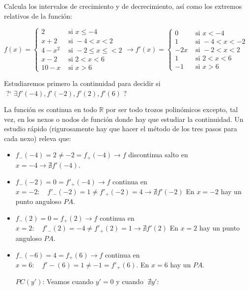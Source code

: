 	\begin{ejem} Calcula los intervalos de crecimiento y de decrecimiento, así como los extremos relativos de la función:
	\label{ejem:extremos-trozos}
	
	$f(x)=\begin{cases}
	  2 & \mbox{ si } x\le -4  \\
	   x + 2& \mbox{ si }  -4<x<2 \\
	 4-x^2 & \mbox{ si } -2 \le x \le <2  \\
	  x-2 & \mbox{ si } 2< x <6  \\
	  10-x& \mbox{ si } x>6   
	\end{cases} \to 
	f'(x)=
	\begin{cases}
	  0 & \mbox{ si } x< -4  \\
	  1 & \mbox{ si }  -4<x < -2 \\
	 -2x & \mbox{ si } -2<x<2  \\
	  1 & \mbox{ si } 2 < x < 6  \\
	  -1 & \mbox{ si } x>6   
	\end{cases}
	$
	
	\noindent Estudiaremos primero la continuidad para decidir si $\mbox{ ?` } \exists f'(-4), f'(-2), f'(2), f'(6) \mbox { ? }$
	
	La función es continua en todo $\mathbb R$ por ser todo trozos polinómicos excepto, tal vez, en los nexos o nodos de función donde hay que estudiar  la continuidad. Un estudio rápido (rigurosamente hay que hacer el método de los tres pasos para cada nexo) releva que:
	
		
	\begin{itemize}

	\item $f_-(-4)=2 \neq -2 =f_+(-4) \to f $ discontinua salto en $x=-4 \to \nexists  f'(-4)$. 
	
	\item $f_-(-2)=0=f'_+(-4) \to f $ continua en $x=-2:\quad f'_-(-2)=1	\neq f'_+(-2)=4 \to \nexists f'(-2)$ En $x=-2$ hay un punto anguloso $PA$.
	
	\item $f_-(2)=0=f_+(2) \to f $ continua en $x=2:\quad f'_-(2)=-4 	\neq f'_+(2)=1 \to \nexists f'(2)$ En $x=2$ hay un punto anguloso $PA$.
	
	\item $f_-(-6)=4=f_+(6) \to f $ continua en $x=6:\quad f'-(6)=1 \neq -1 =f'_+(6)$. En $x=6$ hay un $PA$. 
	
	$PC(y')$: Veamos cuando $y'=0$ y cuando $\; \nexists y'$:
	

\end{itemize}
\end{ejem}
